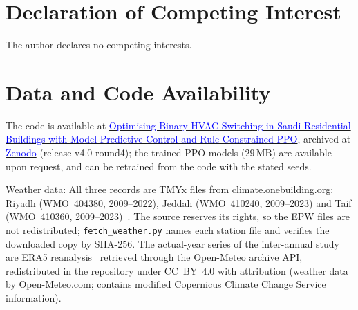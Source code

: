 \documentclass[3p,twocolumn,number]{elsarticle}
\begin{document}
\section{Declaration of Competing Interest}
The author declares no competing interests.

 
\section{Data and Code Availability}
\label{sec:data}
The code is available at \href{https://github.com/drhamzahfaraj/Hybrid-Rule-Constrained-PPO-for-Cost-Effective-Binary-HVAC-Scheduling-in-Saudi-Residential-Buildings}{\textcolor{blue}{Optimising Binary HVAC Switching in Saudi Residential Buildings with Model Predictive Control and Rule-Constrained PPO}}, archived at \href{https://doi.org/10.5281/zenodo.24199676}{\textcolor{blue}{Zenodo}} (release v4.0-round4); the trained PPO models ($29\,$MB) are available upon request, and can be retrained from the code with the stated seeds.

Weather data: All three records are TMYx files from climate.onebuilding.org: Riyadh (WMO~404380, 2009--2022), Jeddah (WMO~410240, 2009--2023) and Taif (WMO~410360, 2009--2023)~\cite{EPW2023}. The source reserves its rights, so the EPW files are not redistributed; \texttt{fetch\_weather.py} names each station file and verifies the downloaded copy by SHA-256. The actual-year series of the inter-annual study are ERA5 reanalysis~\cite{Hersbach2020} retrieved through the Open-Meteo archive API, redistributed in the repository under CC~BY~4.0 with attribution (weather data by Open-Meteo.com; contains modified Copernicus Climate Change Service information).



\end{document}
